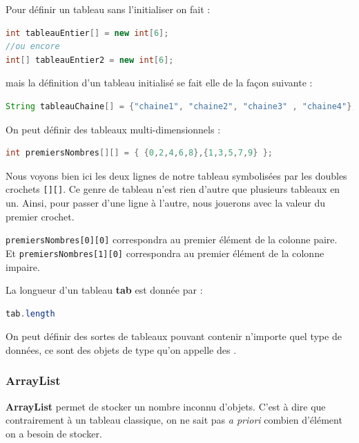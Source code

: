 \documentclass[a4paper,twoside]{article}
\begin{document}
Pour définir un tableau sans l'initialiser on fait :
\begin{lstlisting}[language=java]
int tableauEntier[] = new int[6];
//ou encore
int[] tableauEntier2 = new int[6];
\end{lstlisting}
mais la définition d'un tableau initialisé se fait elle de la façon suivante :
\begin{lstlisting}[language=java]
String tableauChaine[] = {"chaine1", "chaine2", "chaine3" , "chaine4"};
\end{lstlisting}

\bigskip

On peut définir des tableaux multi-dimensionnels : 
\begin{lstlisting}[language=java]
int premiersNombres[][] = { {0,2,4,6,8},{1,3,5,7,9} };
\end{lstlisting}

Nous voyons bien ici les deux lignes de notre tableau symbolisées par les doubles crochets \texttt{[][]}. Ce genre de tableau n'est rien d'autre que plusieurs tableaux en un. Ainsi, pour passer d'une ligne à l'autre, nous jouerons avec la valeur du premier crochet.
\begin{exemple}
\verb|premiersNombres[0][0]| correspondra au premier élément de la colonne paire.\\
Et \verb|premiersNombres[1][0]| correspondra au premier élément de la colonne impaire.
\end{exemple}

\begin{remarque}
La longueur d'un tableau \textbf{tab} est donnée par :
\begin{lstlisting}[language=java]
tab.length
\end{lstlisting}
\end{remarque}

\begin{important}
On peut définir des sortes de tableaux pouvant contenir n'importe quel type de données, ce sont des objets de type  qu'on appelle des .
\end{important}

\subsubsection{ArrayList}
\textbf{ArrayList} permet de stocker un nombre inconnu d'objets. C'est à dire que contrairement à un tableau classique, on ne sait pas \emph{a priori} combien d'élément on a besoin de stocker. 
\end{document}
